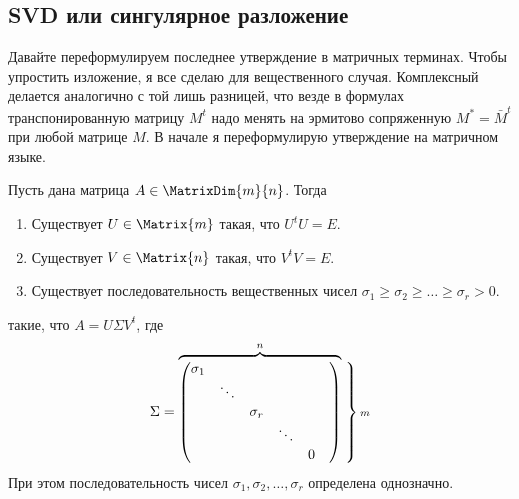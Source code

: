 \subsection{SVD или сингулярное разложение}

Давайте переформулируем последнее утверждение в матричных терминах.
Чтобы упростить изложение, я все сделаю для вещественного случая.
Комплексный делается аналогично с той лишь разницей, что везде в формулах транспонированную матрицу $M^t$ надо менять на эрмитово сопряженную $M^* = \bar M^t$ при любой матрице $M$.
В начале я переформулирую утверждение на матричном языке.

\begin{claim}
Пусть дана матрица $A\in \MatrixDim{m}{n}$.
Тогда \begin{enumerate}
\item Существует $U\in \Matrix{m}$ такая, что $U^t U = E$.

\item Существует $V\in \Matrix{n}$ такая, что $V^t V = E$.

\item Существует последовательность вещественных чисел $\sigma_1\geqslant \sigma_2\geqslant \ldots\geqslant \sigma_r > 0$.
\end{enumerate}
такие, что $A = U \Sigma V^t$, где
\[
\Sigma =
\overbrace{
\begin{pmatrix}
{\sigma_1}&{}&{}&{}&{}&{}\\
{}&{\ddots}&{}&{}&{}&{}\\
{}&{}&{\sigma_r}&{}&{}&{}\\
{}&{}&{}&{\ddots}&{}&{}\\
{}&{}&{}&{}&{0}&{}\\
\end{pmatrix}
}^n
\left.
\vphantom{
\begin{pmatrix}
{\sigma_1}&{}&{}&{}&{}&{}\\
{}&{\ddots}&{}&{}&{}&{}\\
{}&{}&{\sigma_r}&{}&{}&{}\\
{}&{}&{}&{\ddots}&{}&{}\\
{}&{}&{}&{}&{0}&{}\\
\end{pmatrix}
}
\right\}{\scriptstyle m}
\]
При этом последовательность чисел $\sigma_1,\sigma_2,\ldots,\sigma_r$ определена однозначно.
\end{claim}

